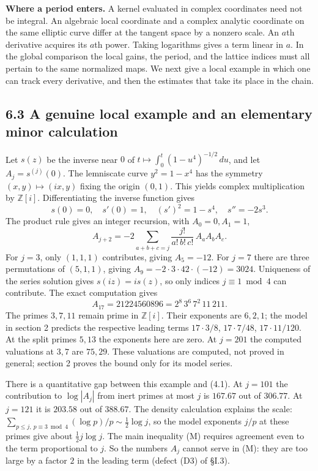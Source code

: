 \documentclass[11pt,letterpaper]{article}
\begin{document}
{\textbf{Where a period enters.} A kernel evaluated in complex coordinates need not be integral. An algebraic local coordinate and a complex analytic coordinate on the same elliptic curve differ at the tangent space by a nonzero scale. An $a$th derivative acquires its $a$th power. Taking logarithms gives a term linear in $a$. In the global comparison the local gains, the period, and the lattice indices must all pertain to the same normalized maps. We next give a local example in which one can track every derivative, and then the estimates that take its place in the chain.

\newpage
\subsection*{6.3 A genuine local example and an elementary minor calculation}

Let $s(z)$ be the inverse near $0$ of $t\mapsto\int_0^t(1-u^4)^{-1/2}\,du$, and let $A_j=s^{(j)}(0)$. The lemniscate curve $y^2=1-x^4$ has the symmetry $(x,y)\mapsto(ix,y)$ fixing the origin $(0,1)$. This yields complex multiplication by $\mathbb Z[i]$. Differentiating the inverse function gives
\begin{equation}\label{D:81}
 s(0)=0,\quad s'(0)=1,\quad (s')^2=1-s^4,\quad s''=-2s^3.
\end{equation}
The product rule gives an integer recursion, with $A_0=0,A_1=1$,
\begin{equation}\label{D:82}
 A_{j+2}=-2\!\sum_{a+b+c=j}\frac{j!}{a!\,b!\,c!}\,A_a A_b A_c.
\end{equation}
For $j=3$, only $(1,1,1)$ contributes, giving $A_5=-12$. For $j=7$ there are three permutations of $(5,1,1)$, giving $A_9=-2\cdot3\cdot42\cdot(-12)=3024$. Uniqueness of the series solution gives $s(iz)=is(z)$, so only indices $j\equiv1\bmod4$ can contribute. The exact computation gives
\begin{equation}\label{D:83}
 A_{17}=21224560896=2^8\,3^6\,7^2\,11\,211 .
\end{equation}
The primes $3,7,11$ remain prime in $\mathbb Z[i]$. Their exponents are $6,2,1$; the model in section 2 predicts the respective leading terms $17\cdot3/8$, $17\cdot7/48$, $17\cdot11/120$. At the split primes $5,13$ the exponents here are zero. At $j=201$ the computed valuations at $3,7$ are $75,29$. These valuations are computed, not proved in general; section 2 proves the bound only for its model series.

There is a quantitative gap between this example and (4.1). At $j=101$ the contribution to $\log|A_j|$ from inert primes at most $j$ is $167.67$ out of $306.77$. At $j=121$ it is $203.58$ out of $388.67$. The density calculation explains the scale: $\sum_{p\le j,\ p\equiv3\bmod4}(\log p)/p\sim\tfrac12\log j$, so the model exponents $j/p$ at these primes give about $\tfrac12 j\log j$. The main inequality (M) requires agreement even to the term proportional to $j$. So the numbers $A_j$ cannot serve in (M): they are too large by a factor $2$ in the leading term (defect (D3) of \S I.3).

}
\end{document}
